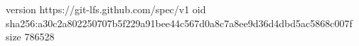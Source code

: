 version https://git-lfs.github.com/spec/v1
oid sha256:a30c2a802250707b5f229a91bee44c567d0a8c7a8ee9d36d4dbd5ac5868c007f
size 786528
